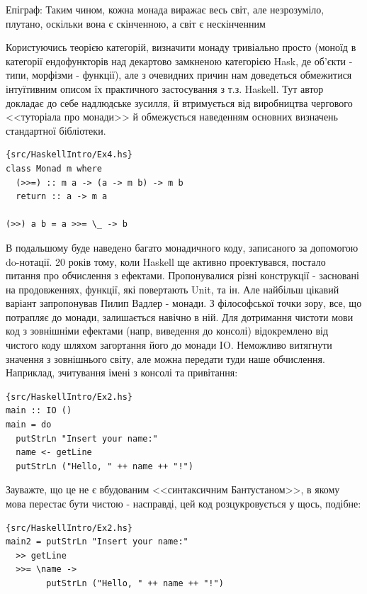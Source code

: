 \documentclass[12pt]{article}
\begin{document}
{\let\relax\footnotetext{Епіграф: Таким чином, кожна монада виражає весь світ, але незрозуміло, плутано, оскільки вона є скінченною, а світ є нескінченним}}

Користуючись теорією категорій, визначити монаду тривіально просто (моноїд в категорії ендофункторів над декартово замкненою категорією Hask, де об'єкти - типи, морфізми - функції), але з очевидних причин нам доведеться обмежитися інтуїтивним описом їх практичного застосування з т.з. Haskell.
Тут автор докладає до себе надлюдське зусилля, й втримується від виробництва чергового <<туторіала про монади>> й обмежується наведенням основних визначень стандартної бібліотеки.\\



\begin{lstlisting}{src/HaskellIntro/Ex4.hs}
class Monad m where
  (>>=) :: m a -> (a -> m b) -> m b
  return :: a -> m a

(>>) a b = a >>= \_ -> b
\end{lstlisting}

В подальшому буде наведено багато монадичного коду, записаного за допомогою
do-нотації. 20 років тому, коли Haskell ще активно проектувався, постало
питання про обчислення з ефектами. Пропонувалися\cite{lazyClass} різні
конструкції - засновані на продовженнях, функції, які повертають Unit, та
ін. Але найбільш цікавий варіант запропонував Пилип Вадлер - монади. З
філософської точки зору\cite{deleuze}, все, що потрапляє до монади,
залишається навічно в ній. Для дотримання 
чистоти мови код з зовнішніми ефектами (напр, виведення до консолі)
відокремлено від чистого коду 
шляхом загортання його до монади IO. Неможливо витягнути значення з зовнішнього світу, але можна передати туди наше обчислення. Наприклад, зчитування імені з консолі та привітання:\\

\begin{lstlisting}{src/HaskellIntro/Ex2.hs}
main :: IO ()
main = do
  putStrLn "Insert your name:"
  name <- getLine
  putStrLn ("Hello, " ++ name ++ "!")
\end{lstlisting}

Зауважте, що це не є вбудованим <<синтаксичним Бантустаном>>, в якому мова перестає бути чистою - 
насправді, цей код розцукровується у щось, подібне:\\

\begin{lstlisting}{src/HaskellIntro/Ex2.hs}
main2 = putStrLn "Insert your name:"
  >> getLine
  >>= \name ->
        putStrLn ("Hello, " ++ name ++ "!")
\end{lstlisting}
\end{document}
